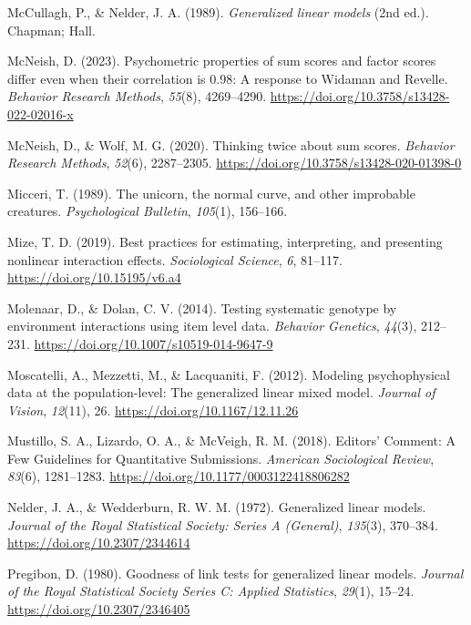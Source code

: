 \documentclass[
  man,
  longtable,
  nolmodern,
  notxfonts,
  notimes,
  colorlinks=true,linkcolor=blue,citecolor=blue,urlcolor=blue]{apa7}
\newlength{\cslhangindent}
\newenvironment{CSLReferences}[2] %
 {\begin{list}{}{%
  \setlength{\itemindent}{0pt}
  \setlength{\leftmargin}{0pt}
  \setlength{\parsep}{0pt}
  \ifodd #1
   \setlength{\leftmargin}{\cslhangindent}
   \setlength{\itemindent}{-1\cslhangindent}
  \fi
  \setlength{\itemsep}{#2\baselineskip}}}
 {\end{list}}
\begin{document}
\begin{CSLReferences}{1}{0}
McCullagh, P., \& Nelder, J. A. (1989). \emph{Generalized linear models}
(2nd ed.). Chapman; Hall.

McNeish, D. (2023). Psychometric properties of sum scores and factor
scores differ even when their correlation is 0.98: A response to Widaman
and Revelle. \emph{Behavior Research Methods}, \emph{55}(8), 4269--4290.
\url{https://doi.org/10.3758/s13428-022-02016-x}

McNeish, D., \& Wolf, M. G. (2020). Thinking twice about sum scores.
\emph{Behavior Research Methods}, \emph{52}(6), 2287--2305.
\url{https://doi.org/10.3758/s13428-020-01398-0}

Micceri, T. (1989). The unicorn, the normal curve, and other improbable
creatures. \emph{Psychological Bulletin}, \emph{105}(1), 156--166.

Mize, T. D. (2019). Best practices for estimating, interpreting, and
presenting nonlinear interaction effects. \emph{Sociological Science},
\emph{6}, 81--117. \url{https://doi.org/10.15195/v6.a4}

Molenaar, D., \& Dolan, C. V. (2014). Testing systematic genotype by
environment interactions using item level data. \emph{Behavior
Genetics}, \emph{44}(3), 212--231.
\url{https://doi.org/10.1007/s10519-014-9647-9}

Moscatelli, A., Mezzetti, M., \& Lacquaniti, F. (2012). Modeling
psychophysical data at the population-level: The generalized linear
mixed model. \emph{Journal of Vision}, \emph{12}(11), 26.
\url{https://doi.org/10.1167/12.11.26}

Mustillo, S. A., Lizardo, O. A., \& McVeigh, R. M. (2018). Editors{'}
Comment: A Few Guidelines for Quantitative Submissions. \emph{American
Sociological Review}, \emph{83}(6), 1281--1283.
\url{https://doi.org/10.1177/0003122418806282}

Nelder, J. A., \& Wedderburn, R. W. M. (1972). Generalized linear
models. \emph{Journal of the Royal Statistical Society: Series A
(General)}, \emph{135}(3), 370--384.
\url{https://doi.org/10.2307/2344614}

Pregibon, D. (1980). Goodness of link tests for generalized linear
models. \emph{Journal of the Royal Statistical Society Series C: Applied
Statistics}, \emph{29}(1), 15--24. \url{https://doi.org/10.2307/2346405}


\end{CSLReferences}
\end{document}
